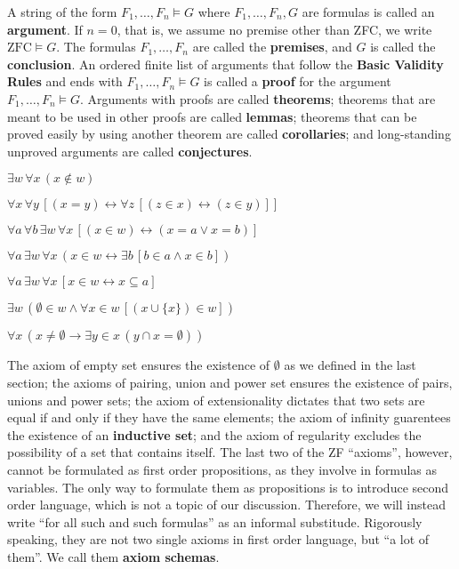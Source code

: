 \documentclass[11pt]{book}
\begin{document}
 A string of the form $F_1,\dots,F_n\vDash G$ where $F_1,\dots,F_n,G$ are formulas is called an \textbf{argument}. If $n=0$, that is, we assume no premise other than ZFC, we write $\mathrm{ZFC}\vDash G$. The formulas $F_1,\dots,F_n$ are called the \textbf{premises}, and $G$ is called the \textbf{conclusion}. An ordered finite list of arguments that follow the \textbf{Basic Validity Rules} and ends with $F_1,\dots,F_n\vDash G$ is called a \textbf{proof} for the argument $F_1,\dots,F_n\vDash G$. Arguments with proofs are called \textbf{theorems}; theorems that are meant to be used in other proofs are called \textbf{lemmas}; theorems that can be proved easily by using another theorem are called \textbf{corollaries}; and long-standing unproved arguments are called \textbf{conjectures}. 

\begin{axiom}$\exists w\, \forall x\,(x\not\in w)$
\end{axiom}
\begin{axiom}$\forall x\,\forall y\,[(x=y)\leftrightarrow \forall z\,[(z\in x)\leftrightarrow (z\in y)]]$
\end{axiom}
\begin{axiom}$\forall a \,\forall b \,\exists w \,\forall x\,[(x \in w) \leftrightarrow (x=a \lor x=b)]$
\end{axiom}
\begin{axiom}$\forall a\,\exists w\,\forall x\,(x\in w\leftrightarrow \exists b\, [b\in a\land x\in b])$
\end{axiom}
\begin{axiom}$\forall a \,\exists w\, \forall x\,[x \in w \leftrightarrow x\subseteq a]$
\end{axiom}
\begin{axiom}$\exists w\,(\emptyset\in w\land\forall x\in w\,[(x\cup \{x\})\in w])$
\end{axiom}
\begin{axiom}$\forall x\,(x\ne \emptyset\rightarrow \exists y\in x\,(y\cap x=\emptyset))$
\end{axiom}
The axiom of empty set ensures the existence of $\emptyset$ as we defined in the last section; the axioms of pairing, union and power set ensures the existence of pairs, unions and power sets; the axiom of extensionality dictates that two sets are equal if and only if they have the same elements; the axiom of infinity guarentees the existence of an \textbf{inductive set}; and the axiom of regularity excludes the possibility of a set that contains itself. The last two of the ZF ``axioms'', however, cannot be formulated as first order propositions, as they involve in formulas as variables. The only way to formulate them as propositions is to introduce second order language, which  is not a topic of our discussion. Therefore, we will instead write ``for all such and such formulas'' as an informal substitude. Rigorously speaking, they are not two single axioms in first order language, but ``a lot of them''. We call them \textbf{axiom schemas}.
\end{document}
